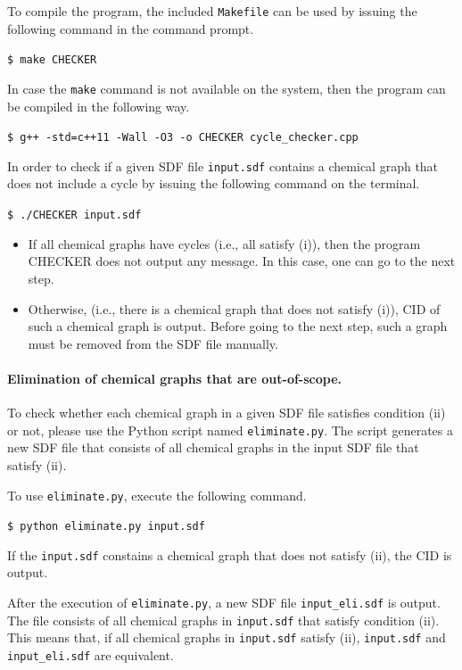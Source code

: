 \documentclass[11pt,titlepage,dvipdfmx,twoside]{book}
\begin{document}
To compile the program, the included {\tt Makefile}
can be used by issuing the following command in the command prompt.
\begin{oframed}
{\small
\verb|$ make CHECKER|
}
\end{oframed}
%
In case the {\tt make} command is not available on the system,
then the program can be compiled in the following way.
\begin{oframed}
{\small
\verb|$ g++ -std=c++11 -Wall -O3 -o CHECKER cycle_checker.cpp|
}
\end{oframed}

In order to check if a given
SDF file {\tt input.sdf} contains a chemical graph that does not include
a cycle by issuing the following command on the terminal.
\begin{oframed}
{\small
\verb|$ ./CHECKER input.sdf|
}
\end{oframed}


\begin{itemize}
\item If all chemical graphs have cycles
  (i.e., all satisfy (i)),
  then the program CHECKER does not output any message.
  In this case, one can go to the next step. 
\item Otherwise, (i.e., there is a chemical graph that does not satisfy (i)),
  CID of such a chemical graph is output.
  Before going to the next step,
  such a graph must be removed from the SDF file manually.  
\end{itemize}

\paragraph{Elimination of chemical graphs that are out-of-scope.}
To check whether each chemical graph in a given SDF file
satisfies condition (ii) or not,
please use the Python script named 
{\tt eliminate.py}.
The script generates a new SDF file
that consists of all chemical graphs in the input SDF file
that satisfy (ii). 

To use {\tt eliminate.py}, execute the following command. 

\begin{oframed}
{\small
\verb|$ python eliminate.py input.sdf|
}
\end{oframed}

If the {\tt input.sdf} constains a chemical graph
that does not satisfy (ii), the CID is output.

After the execution of {\tt eliminate.py},
a new SDF file {\tt input\_eli.sdf} is output.
The file consists of all chemical graphs in {\tt input.sdf}
that satisfy condition (ii).
%
This means that, if all chemical graphs in {\tt input.sdf}
satisfy (ii), 
{\tt input.sdf} and {\tt input\_eli.sdf} are equivalent. 
\end{document}
